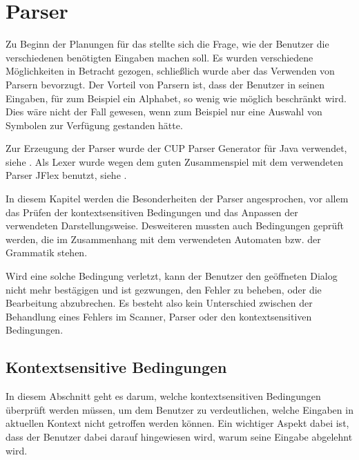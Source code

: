 

\chapter{Parser}\label{Parser}

Zu Beginn der Planungen für das \gtitool stellte sich die Frage, wie der
Benutzer die verschiedenen benötigten Eingaben machen soll. Es wurden
verschiedene Möglichkeiten in Betracht gezogen, schließlich wurde aber das
Verwenden von Parsern bevorzugt. Der Vorteil von Parsern ist, dass der Benutzer
in seinen Eingaben, für zum Beispiel ein Alphabet, so wenig wie möglich
beschränkt wird. Dies wäre nicht der Fall gewesen, wenn zum Beispiel nur eine
Auswahl von Symbolen zur Verfügung gestanden hätte.\vspace{10pt}

Zur Erzeugung der Parser wurde der CUP Parser Generator für Java verwendet, siehe
\cite{java-cup}. Als Lexer wurde wegen dem guten Zusammenspiel mit dem
verwendeten Parser JFlex benutzt, siehe \cite{jflex}.\vspace{10pt}

In diesem Kapitel werden die Besonderheiten der Parser angesprochen, vor allem
das Prüfen der kontextsensitiven Bedingungen und das Anpassen der verwendeten
Darstellungsweise. Desweiteren mussten auch Bedingungen geprüft werden, die im
Zusammenhang mit dem verwendeten Automaten bzw. der Grammatik
stehen.\vspace{10pt}

Wird eine solche Bedingung verletzt, kann der Benutzer den geöffneten Dialog
nicht mehr bestägigen und ist gezwungen, den Fehler zu beheben, oder die
Bearbeitung abzubrechen. Es besteht also kein Unterschied zwischen der
Behandlung eines Fehlers im Scanner, Parser oder den kontextsensitiven
Bedingungen.


\section{Kontextsensitive Bedingungen}

In diesem Abschnitt geht es darum, welche kontextsensitiven Bedingungen
überprüft werden müssen, um dem Benutzer zu verdeutlichen, welche Eingaben
in aktuellen Kontext nicht getroffen werden können. Ein wichtiger Aspekt dabei
ist, dass der Benutzer dabei darauf hingewiesen wird, warum seine Eingabe
abgelehnt wird.\vspace{10pt}

